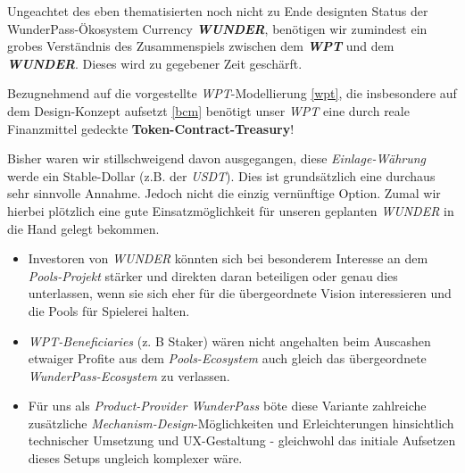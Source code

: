 \vspace{0.3cm}

Ungeachtet des eben thematisierten noch nicht zu Ende designten Status der WunderPass-Ökosystem Currency \textbf{\textit{WUNDER}}, benötigen wir zumindest ein grobes Verständnis des Zusammenspiels zwischen dem \textbf{\textit{WPT}} und dem \textbf{\textit{WUNDER}}. Dieses wird zu gegebener Zeit geschärft.

\vspace{0.3cm}

\begin{Konzept}
\vspace{0.2cm}

Bezugnehmend auf die vorgestellte \textit{WPT}-Modellierung \ref{wpt}, die insbesondere auf dem Design-Konzept aufsetzt \ref{bcm} benötigt unser \textit{WPT} eine durch reale Finanzmittel gedeck\-te \textbf{Token-Contract-Treasury}!

\vspace{0.2cm}

Bisher waren wir stillschweigend davon ausgegangen, diese \textit{Einlage-Währung} werde ein Stable-Dollar (z.B. der \textit{USDT}). Dies ist grundsätzlich eine durchaus sehr sinn\-volle Annahme. Jedoch nicht die einzig vernünftige Option. Zumal wir hierbei plötzlich eine gute Einsatzmöglichkeit für unseren geplanten \textit{WUNDER} in die Hand gelegt bekommen.

\vspace{0.3cm}

\vspace{0.3cm}

\begin{itemize}
	\item Investoren von \textit{WUNDER} könnten sich bei besonderem Interesse an dem \textit{Pools-Projekt} stärker und direkten daran beteiligen oder genau dies unterlassen, wenn sie sich eher für die übergeordnete Vision interessieren und die Pools für Spielerei halten.
	\item \textit{WPT-Beneficiaries} (z. B Staker) wären nicht angehalten beim Auscashen etwaiger Profite aus dem \textit{Pools-Ecosystem} auch gleich das übergeordnete \textit{WunderPass-Ecosystem} zu verlassen.
	\item Für uns als \textit{Product-Provider WunderPass} böte diese Variante zahlreiche zusätzliche \textit{Mechanism-Design}-Möglichkeiten und Erleichterungen hinsichtlich technischer Umsetzung und UX-Gestaltung - gleichwohl das initiale Aufsetzen dieses Setups ungleich komplexer wäre.
	

\end{itemize}
\end{Konzept}
